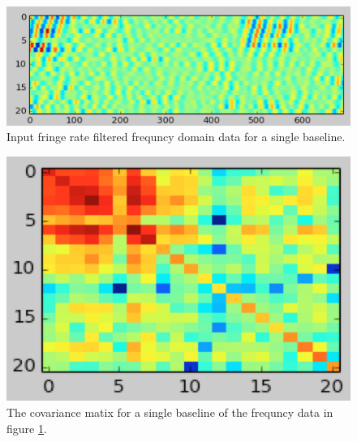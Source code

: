 \documentclass[twocolumn,numberedappendix]{emulateapj}
\begin{document}
\begin{figure}[h!]\centering
\includegraphics[width=2\columnwidth, height=.8\columnwidth]{plots/x_example.png}
\caption{Input fringe rate filtered frequncy domain data for a single baseline.}
\label{fig:x_example}
\end{figure}

\begin{figure}[h!]\centering
\includegraphics[width=\columnwidth, height=.8\columnwidth]{plots/C_example.png}
\caption{The covariance matix for a single baseline of the frequncy data in
figure \ref{fig:x_example}.} 
\label{fig:C_example}
\end{figure}
\end{document}
